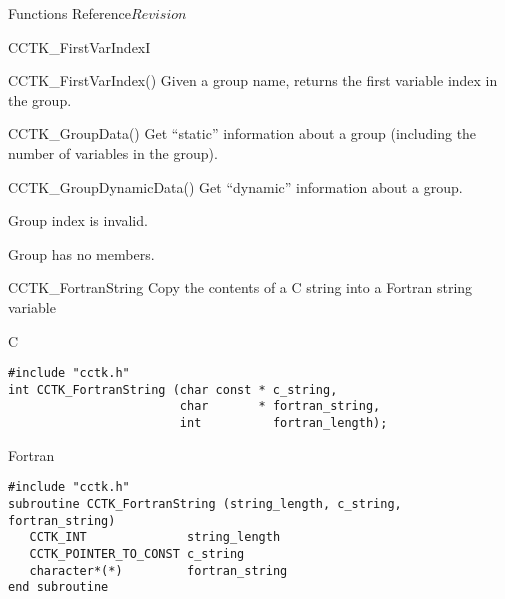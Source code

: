 \begin{cactuspart}{ Functions Reference}{}{$Revision$}
\begin{FunctionDescription}{CCTK\_FirstVarIndexI}
\begin{SeeAlsoSection}
\begin{SeeAlso}{CCTK\_FirstVarIndex()}
Given a group name, returns the first variable index in the group.
\end{SeeAlso}
\begin{SeeAlso}{CCTK\_GroupData()}
Get ``static'' information about a group
(including the number of variables in the group).
\end{SeeAlso}
\begin{SeeAlso}{CCTK\_GroupDynamicData()}
Get ``dynamic'' information about a group.
\end{SeeAlso}
\end{SeeAlsoSection}

\begin{ErrorSection}
\begin{Error}{-1}
Group index is invalid.
\end{Error}
\begin{Error}{-2}
Group has no members.
\end{Error}
\end{ErrorSection}
\end{FunctionDescription}


\begin{FunctionDescription}{CCTK\_FortranString}
\label{CCTK-FortranString}
Copy the contents of a C string into a Fortran string variable

\begin{SynopsisSection}
\begin{Synopsis}{C}
\begin{verbatim}
#include "cctk.h"
int CCTK_FortranString (char const * c_string,
                        char       * fortran_string,
                        int          fortran_length);
\end{verbatim}
\end{Synopsis}
\begin{Synopsis}{Fortran}
\begin{verbatim}
#include "cctk.h"
subroutine CCTK_FortranString (string_length, c_string, fortran_string)
   CCTK_INT              string_length
   CCTK_POINTER_TO_CONST c_string
   character*(*)         fortran_string
end subroutine
\end{verbatim}
\end{Synopsis}
\end{SynopsisSection}


\end{FunctionDescription}
\end{cactuspart}
